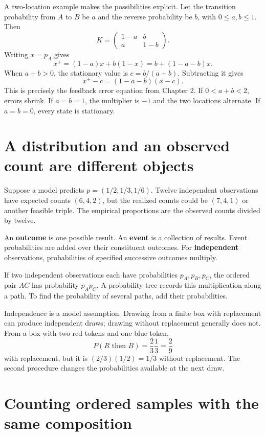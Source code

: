 \documentclass[11pt,oneside,openany]{book}
\theoremstyle{definition}
\theoremstyle{remark}
\numberwithin{equation}{chapter}
\begin{document}
A two-location example makes the possibilities explicit. Let the transition probability from \(A\) to \(B\) be \(a\) and the reverse probability be \(b\), with \(0\leq a,b\leq1\). Then \[K=\begin{pmatrix}1-a&b\\a&1-b\end{pmatrix}.\] Writing \(x=p_A\) gives \[x^+=(1-a)x+b(1-x)=b+(1-a-b)x.\] When \(a+b>0\), the stationary value is \(c=b/(a+b)\). Subtracting it gives \[x^+-c=(1-a-b)(x-c).\] This is precisely the feedback error equation from Chapter 2. If \(0<a+b<2\), errors shrink. If \(a=b=1\), the multiplier is \(-1\) and the two locations alternate. If \(a=b=0\), every state is stationary.

\section{A distribution and an observed count are different objects}\label{ch04-a-distribution-and-an-observed-count-are-different-objects}

Suppose a model predicts \(p=(1/2,1/3,1/6)\). Twelve independent observations have expected counts \((6,4,2)\), but the realized counts could be \((7,4,1)\) or another feasible triple. The empirical proportions are the observed counts divided by twelve.

An \textbf{outcome} is one possible result. An \textbf{event} is a collection of results. Event probabilities are added over their constituent outcomes. For \textbf{independent} observations, probabilities of specified successive outcomes multiply.

If two independent observations each have probabilities \(p_A,p_B,p_C\), the ordered pair \(AC\) has probability \(p_Ap_C\). A probability tree records this multiplication along a path. To find the probability of several paths, add their probabilities.

Independence is a model assumption. Drawing from a finite box with replacement can produce independent draws; drawing without replacement generally does not. From a box with two red tokens and one blue token, \[P(R\text{ then }B)=\frac23\frac13=\frac29\] with replacement, but it is \((2/3)(1/2)=1/3\) without replacement. The second procedure changes the probabilities available at the next draw.

\section{Counting ordered samples with the same composition}\label{ch04-counting-ordered-samples-with-the-same-composition}
\end{document}
